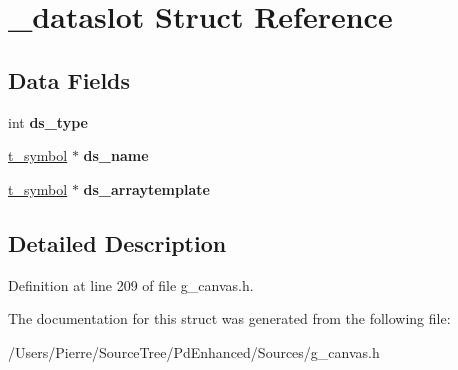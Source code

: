 \hypertarget{struct__dataslot}{\section{\-\_\-dataslot Struct Reference}
\label{struct__dataslot}
}
\subsection*{Data Fields}
\begin{DoxyCompactItemize}
\item 
\hypertarget{struct__dataslot_a0d39b50a7d896242f6f730c44db202ac}{int {\bfseries ds\-\_\-type}}\label{struct__dataslot_a0d39b50a7d896242f6f730c44db202ac}

\item 
\hypertarget{struct__dataslot_a66aa784610e7f06a04e749706e778601}{\hyperlink{struct__symbol}{t\-\_\-symbol} $\ast$ {\bfseries ds\-\_\-name}}\label{struct__dataslot_a66aa784610e7f06a04e749706e778601}

\item 
\hypertarget{struct__dataslot_ad1db6089ae0e77a9c22e90f29efabdfc}{\hyperlink{struct__symbol}{t\-\_\-symbol} $\ast$ {\bfseries ds\-\_\-arraytemplate}}\label{struct__dataslot_ad1db6089ae0e77a9c22e90f29efabdfc}

\end{DoxyCompactItemize}


\subsection{Detailed Description}


Definition at line 209 of file g\-\_\-canvas.\-h.



The documentation for this struct was generated from the following file\-:\begin{DoxyCompactItemize}
\item 
/\-Users/\-Pierre/\-Source\-Tree/\-Pd\-Enhanced/\-Sources/g\-\_\-canvas.\-h\end{DoxyCompactItemize}
